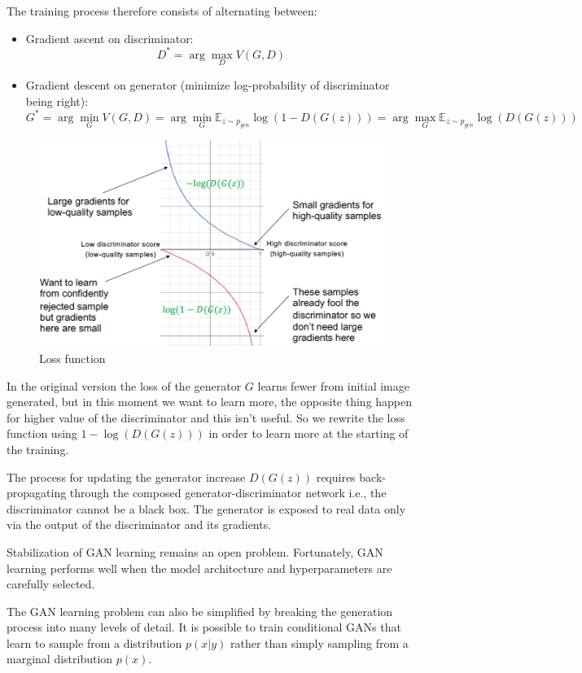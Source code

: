 The training process therefore consists of alternating between:
\begin{itemize}
    \item Gradient ascent on discriminator: 
        \begin{equation}
            D^\ast = \arg \max_D V(G,D)
        \end{equation}
    \item Gradient descent on generator (minimize log-probability of discriminator being right):
        \begin{equation}
            G^\ast = \arg \min_G V(G,D) = \arg \min_G \mathbb{E}_{z\sim p_{gen}} \log(1-D(G(z)))  =  \arg \max_G \mathbb{E}_{z\sim p_{gen}} \log(D(G(z)))
        \end{equation}
\end{itemize}

\begin{figure}[!ht]
    \centering
    \includegraphics[width=0.5\linewidth]{img/GAN/loss.png}
    \caption{Loss function}
    \label{fig:enter-label}
\end{figure}
 
In the original version the loss of the generator $G$ learns fewer from initial image generated, but in
this moment we want to learn more, the opposite thing happen for higher value of the discriminator and
this isn't useful. So we rewrite the loss function using  $1 - \log(D(G(z)))$ in order to learn more at
the starting of the training.

The process for updating the generator increase $D(G(z))$ requires back-propagating through the composed
generator-discriminator network i.e., the discriminator cannot be a black box. The generator is exposed to 
real data only via the output of the discriminator and its gradients.

Stabilization of GAN learning remains an open problem. Fortunately, GAN learning performs well when the 
model architecture and hyperparameters are carefully selected.

The GAN learning problem can also be simplified by breaking the generation process into many levels of 
detail. It is possible to train conditional GANs that learn to sample from a distribution $p(x | y)$ 
rather than simply sampling from a marginal distribution $p(x)$. 

